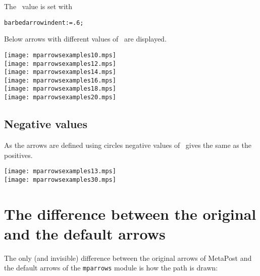 \documentclass[paper=a4,11pt,UKenglish,DIV=calc,BCOR=0mm,parskip=half,fleqn]{scrartcl}
\begin{document}
The \barbedarrowindent\ value is set with
\begin{lstlisting}
barbedarrowindent:=.6;
\end{lstlisting}

Below arrows with different values of \barbedarrowindent\ are displayed.
\begin{description}
\item[\texttt{[image: mparrowsexamples10.mps]}] %
\item[\texttt{[image: mparrowsexamples12.mps]}] %
\item[\texttt{[image: mparrowsexamples14.mps]}] %
\item[\texttt{[image: mparrowsexamples16.mps]}] %
\item[\texttt{[image: mparrowsexamples18.mps]}] %
\item[\texttt{[image: mparrowsexamples20.mps]}] %
\end{description}

\subsection{Negative values}
\label{sec:negative-values}

As the arrows are defined using circles negative values of
\barbedarrowindent\ gives the same as the positives.
\begin{description}
\item[\texttt{[image: mparrowsexamples13.mps]}]
\item[\texttt{[image: mparrowsexamples30.mps]}]
\end{description}

\section{The difference between the original and the default arrows}
\label{sec:diff-betw-orig}

The only (and invisible) difference between the original arrows of
MetaPost and the default arrows of the \texttt{mparrows} module is how
the path is drawn:
\end{document}
